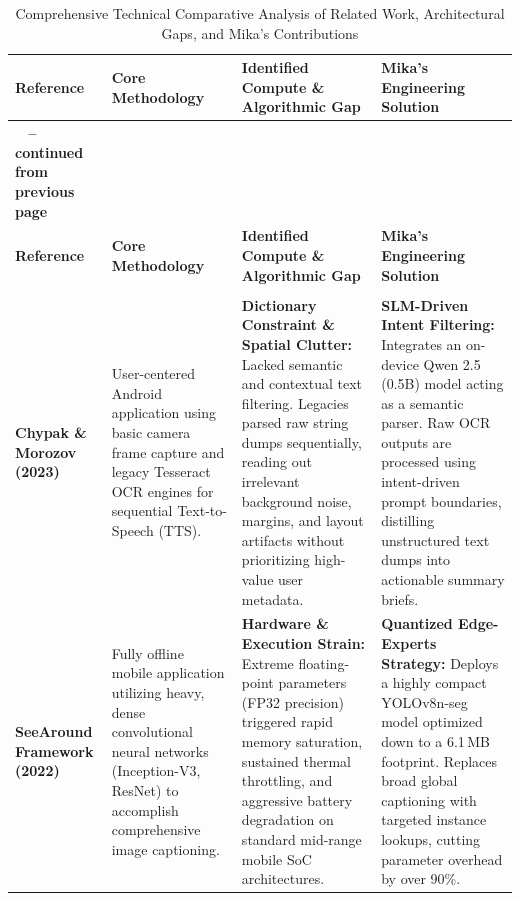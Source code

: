 \documentclass[12pt,a4paper]{report}
\begin{document}
{\small
\begin{xltabular}{\textwidth}{|>{\raggedright\arraybackslash}p{2.2cm}|>{\raggedright\arraybackslash}p{3.2cm}|X|X|}
    \caption{Comprehensive Technical Comparative Analysis of Related Work, Architectural Gaps, and Mika's Contributions}
    \label{tab:comprehensive_lit_review_gaps} \\
    \hline
    \textbf{Reference} & \textbf{Core Methodology} & \textbf{Identified Compute \& Algorithmic Gap} & \textbf{Mika’s Engineering Solution} \\ \hline
    \endfirsthead
    
    {{\bfseries \tablename\ \thetable{} -- continued from previous page}} \\
    \hline
    \textbf{Reference} & \textbf{Core Methodology} & \textbf{Identified Compute \& Algorithmic Gap} & \textbf{Mika’s Engineering Solution} \\ \hline
    \endhead
    
    \hline {} \\ \hline
    \endfoot
    
    \endlastfoot
        
        \textbf{Chypak \& Morozov (2023)} & 
        User-centered Android application using basic camera frame capture and legacy Tesseract OCR engines for sequential Text-to-Speech (TTS). & 
        \textbf{Dictionary Constraint \& Spatial Clutter:} Lacked semantic and contextual text filtering. Legacies parsed raw string dumps sequentially, reading out irrelevant background noise, margins, and layout artifacts without prioritizing high-value user metadata. & 
        \textbf{SLM-Driven Intent Filtering:} Integrates an on-device Qwen 2.5 (0.5B) model acting as a semantic parser. Raw OCR outputs are processed using intent-driven prompt boundaries, distilling unstructured text dumps into actionable summary briefs. \\ \hline
        
        \textbf{SeeAround Framework (2022)} & 
        Fully offline mobile application utilizing heavy, dense convolutional neural networks (Inception-V3, ResNet) to accomplish comprehensive image captioning. & 
        \textbf{Hardware \& Execution Strain:} Extreme floating-point parameters (FP32 precision) triggered rapid memory saturation, sustained thermal throttling, and aggressive battery degradation on standard mid-range mobile SoC architectures. & 
        \textbf{Quantized Edge-Experts Strategy:} Deploys a highly compact YOLOv8n-seg model optimized down to a 6.1\,MB footprint. Replaces broad global captioning with targeted instance lookups, cutting parameter overhead by over 90\%. \\ \hline
        

\end{xltabular}}
\end{document}
